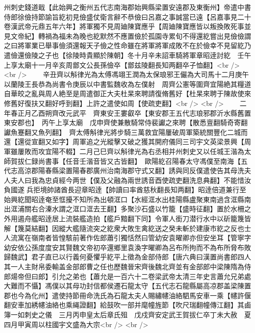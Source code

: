 州刺史錢道戢【此始興之衡州五代志南海郡始興縣梁置安遠郡及東衡州】帝遣中書侍郎徐儉持節諭旨紇初見儉盛仗衛言辭不恭儉曰呂嘉之事誠當已遠【呂嘉事見二十卷漢武帝元鼎五年六年】將軍獨不見周廸陳寶應乎【周廸陳寶應皆以叛換敗死事並見文帝紀】轉禍為福未為晚也紇默然不應置儉於孤園寺累旬不得還紇嘗出見儉儉謂之曰將軍業已舉事儉須還報天子儉之性命雖在將軍將軍成敗不在於儉幸不見留紇乃遣儉還儉陵之子也【徐陵時貴顯於陳朝】冬十月辛未詔車騎將軍章昭逹討紇　壬午上享太廟十一月辛亥周鄫文公長孫儉卒【鄫兹陵翻長知两翻卒子恤翻】<br />
<br />
　　辛丑齊以斛律光為太傅馮翊王潤為太保琅邪王儼為大司馬十二月庚午以蘭陵王長恭為尚書令庚辰以中書監魏收為左僕射　周齊公憲等圍齊宜陽絶其糧道　自華皎之亂與周人絶至是周遣御正大夫杜杲來聘請復脩舊好【杜杲來聘于陳故使來修舊好復扶又翻好呼到翻】上許之遣使如周【使疏吏翻】<br />
<br />
　　二年春正月乙酉朔齊改元武平　齊東安王婁叡卒【東安郡王五代志琅邪郡沂水縣舊置東安郡也】　丙午上享太廟　戊申齊使兼散騎常侍裴讞之來聘【散悉亶翻騎奇寄翻讞魚蹇翻又魚列翻】　齊太傅斛律光將步騎三萬救宜陽屢破周軍築統關豐化二城而還【還從宣翻又如字】周軍追之光縱擊又破之獲其開府儀同三司宇文英梁景興【周軍雖屢敗而攻宜陽不輟】二月己巳齊以斛律光為右丞相并州刺史又以任城王湝為太師賀拔仁録尚書事【任音壬湝音皆又古皆翻】　歐陽紇召陽春太守馮僕至南海【五代志高涼郡陽春縣梁置陽春郡廣州治南海郡守式又翻】誘與同反僕遣使告其母洗夫人夫人曰我為忠貞經今两世【僕及父融為兩世誘音酉使疏吏翻洗息典翻】不能惜汝負國遂兵拒境帥諸酋長迎章昭逹【帥讀曰率酋慈秋翻長知两翻】昭逹倍道兼行至始興紇聞昭逹奄至恇擾不知所為出頓洭口【水經洭水出桂陽縣盧聚東南過含洭縣南出洭浦關右合溱水謂之洭口洭去王翻】多聚沙石盛以竹籠【盛時征翻】置於水柵之外用遏舟艦昭逹居上流裝艦造拍【艦戶黯翻下同】令軍人銜刀潜行水中以斫籠篾皆解【篾莫結翻】因縱大艦隨流突之紇衆大敗生禽紇送之癸未斬於建康市紇之反也士人流寓在嶺南者皆惶駭前著作佐郎蕭引獨恬然曰管幼安袁曜卿亦但安坐耳【管寧字幼安依公孫度度安其賢魏文帝初卒還鄉里袁渙字曜卿為呂布所拘而不為布所脅布敗歸魏武】君子直已以行義何憂懼乎紇平上徵為金部侍郎【唐六典曰漢置尚書郎四人其一人主財帛委輸盖金部郎曹之任也歷魏晉宋齊後魏北齊並有金部郎中梁陳隋為侍郎煬帝但曰郎】引允之弟也【蕭允是一百六十二卷梁武帝太清三年史言蕭允兄弟處大難而不懾】馮僕以其母功封信都侯遷石龍太守【五代志石龍縣屬高凉郡盖梁陳置郡也今為化州】遣使持節冊命洗氏為石龍太夫人賜繡幰油絡駟馬安車一乘【幰許偃翻安車加綉幰油絡也乘䋲證翻】給鼓吹一部并麾幢旌節【吹尺瑞翻幢傳江翻】其鹵簿一如刺史之儀　三月丙申皇太后章氏殂　戊戍齊安定武王賀拔仁卒丁未大赦　夏四月甲寅周以柱國宇文盛為大宗<br />
<br />
